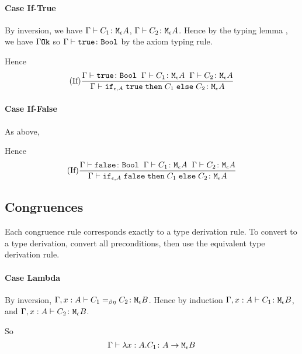 {        \paragraph{Case If-True}
            By inversion, we have $\Gamma \vdash C_1 \colon \texttt{M}_{\epsilon}{A}$, $\Gamma \vdash C_2 \colon \texttt{M}_{\epsilon}{A}$. Hence by the typing lemma , we have $\Gamma \texttt{Ok}$ so $\Gamma \vdash \texttt{true} \colon \texttt{Bool}$ by the axiom typing rule.

            Hence 
            \begin{equation}
                    (\text{If}) \frac{
                        \Gamma \vdash \texttt{true} \colon \texttt{Bool}
                        \;\;
                        \Gamma \vdash C_1 \colon \texttt{M}_{\epsilon}{A}
                        \;\;
                        \Gamma \vdash C_2 \colon \texttt{M}_{\epsilon}{A}
                    }{
                        \Gamma \vdash \texttt{if}_{\epsilon, A}\;\texttt{true}\; \texttt{then}\; C_1 \;\texttt{else} \; C_2 \colon \texttt{M}_{\epsilon}{A}
                    }
            \end{equation}
        \paragraph{Case If-False}
        As above,

        Hence 
        \begin{equation}
            (\text{If}) \frac{
                \Gamma \vdash \texttt{false} \colon \texttt{Bool}
                \;\;
                \Gamma \vdash C_1 \colon \texttt{M}_{\epsilon}{A}
                \;\;
                \Gamma \vdash C_2 \colon \texttt{M}_{\epsilon}{A}
            }{
                \Gamma \vdash \texttt{if}_{\epsilon, A}\;\texttt{false}\; \texttt{then}\; C_1 \;\texttt{else} \; C_2 \colon \texttt{M}_{\epsilon}{A}
            }
    \end{equation}
        \subsection{Congruences}
    Each congruence rule corresponds exactly to a type derivation rule. To convert to a type derivation, convert all preconditions, then use the equivalent type derivation rule.

    \paragraph{Case Lambda}
        By inversion, $\Gamma, x: A \vdash C_1 =_{\beta\eta} C_2 \colon \texttt{M}_{\epsilon}{B}$. Hence by induction $\Gamma, x: A \vdash C_1 \colon \texttt{M}_{\epsilon}{B}$, and $\Gamma, x: A \vdash C_2 \colon \texttt{M}_{\epsilon}{B}$.

        So 
        \begin{equation}
            \Gamma \vdash \lambda x : A. C_1 \colon A \rightarrow \texttt{M}_{\epsilon}{B}
        \end{equation}

}
